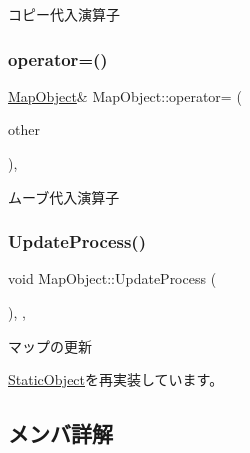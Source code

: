コピー代入演算子 

\mbox{\label{class_map_object_ae36fa838f3f8bac8ef2d67b39adf0298}} 
\subsubsection{\texorpdfstring{operator=()}{operator=()}\hspace{0.1cm}{\footnotesize\ttfamily [2/2]}}
{\footnotesize\ttfamily \mbox{\hyperlink{class_map_object}{Map\+Object}}\& Map\+Object\+::operator= (\begin{DoxyParamCaption}\item[{\mbox{\hyperlink{class_map_object}{Map\+Object}} \&\&}]{other }\end{DoxyParamCaption})\hspace{0.3cm}{\ttfamily [inline]}, {\ttfamily [noexcept]}}



ムーブ代入演算子 

\mbox{\label{class_map_object_ab6b8849f15175417eca94b2703945e4b}} 
\subsubsection{\texorpdfstring{Update\+Process()}{UpdateProcess()}}
{\footnotesize\ttfamily void Map\+Object\+::\+Update\+Process (\begin{DoxyParamCaption}{ }\end{DoxyParamCaption})\hspace{0.3cm}{\ttfamily [final]}, {\ttfamily [protected]}, {\ttfamily [virtual]}}



マップの更新 



\mbox{\hyperlink{class_static_object_a7fa678c3c4032bb6e9417f93a8bb895c}{Static\+Object}}を再実装しています。



\subsection{メンバ詳解}
\mbox{\label{class_map_object_a21c5d70f23cca2a184297d766cc6acdc}} 
